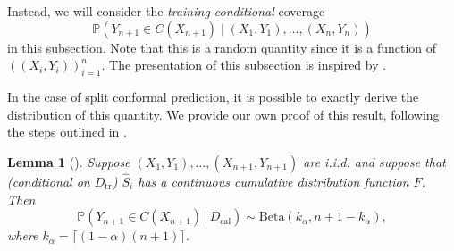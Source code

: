 \documentclass[11pt, titlepage]{article} %
\newcommand{\R}{\mathrm}
\newcommand{\Prob}[1]{\mathbb{P}\left( #1 \right)}
\numberwithin{equation}{section}
\newtheorem{lemma}{Lemma}
\theoremstyle{definition}
\numberwithin{theorem}{section}
\numberwithin{lemma}{section}
\numberwithin{corollary}{section}
\numberwithin{proposition}{section}
\numberwithin{definition}{section}
\numberwithin{remark}{section}
\begin{document}
\noindent
Instead, we will consider the \textit{training-conditional} coverage \cite{angelopoulos2024theoreticalfoundationsconformalprediction,tibs_advanced_topics} \[\Prob{Y_{n+1} \in C(X_{n+1}) \mid (X_1, Y_1), \ldots, (X_n, Y_n)} \] in this subsection.   Note that this is a random quantity since it is a function of \(((X_i, Y_i))_{i=1}^n\). The presentation of this subsection is inspired by \cite{angelopoulos2021gentle,angelopoulos2024theoreticalfoundationsconformalprediction,tibs_advanced_topics}. \vskip5pt

\noindent
In the case of split conformal prediction, it is possible to exactly derive the distribution of this quantity. We provide our own proof of this result, following the steps outlined in \cite{tibs_advanced_topics_homework}.

\begin{lemma}[\cite{tibs_advanced_topics}]
    Suppose \((X_1, Y_1), \ldots, (X_{n+1}, Y_{n+1})\) are i.i.d. and suppose that (conditional on \(D_\R{tr}\)) \(\hat{S}_i\) has a continuous cumulative distribution function \(F\). Then \[
        \Prob{Y_{n+1} \in C(X_{n+1}) \, | \, D_\R{cal}} \sim \R{Beta}(k_\alpha, n + 1 - k_\alpha), 
    \] where \(k_\alpha = \lceil (1-\alpha)(n+1) \rceil\).
\label{lemma:training_conditional_coverage}
\end{lemma}
\end{document}
